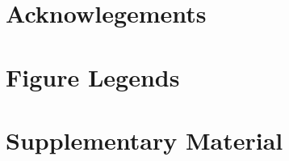 

\section{Acknowlegements}



{\footnotesize


}


\pagebreak
\FloatBarrier
\section{Figure Legends}


\pagebreak
\FloatBarrier

\beginsupplement
\setcounter{secnumdepth}{4}
\section{Supplementary Material}


\pagebreak


\pagebreak

% 

\pagebreak


% 
% 



